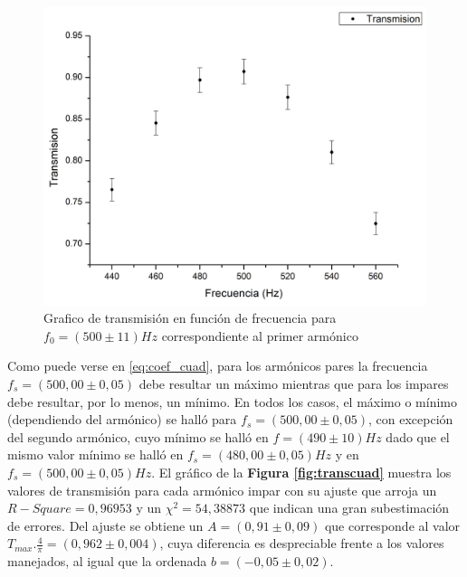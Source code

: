 \documentclass[11pt,a4paper]{article}
\begin{document}
\begin{figure}[h]
\centering
\includegraphics[scale=0.4]{Trans_vs_Frec_Cuad1}
\caption{Grafico de transmisión en función de frecuencia para $f_0 = (500 \pm 11)Hz$ correspondiente al primer armónico}
\label{fig:armonico1cuad}
\end{figure}

Como puede verse en \eqref{eq:coef_cuad}, para los armónicos pares la frecuencia $f_s = (500,00 \pm 0,05)$ debe resultar un máximo mientras que para los impares debe resultar, por lo menos, un mínimo. En todos los casos, el máximo o mínimo (dependiendo del armónico) se halló para $f_s = (500,00 \pm 0,05)$, con excepción del segundo armónico, cuyo mínimo se halló en $f = (490 \pm 10)Hz$ dado que el mismo valor mínimo se halló en $f_s = (480,00 \pm 0,05)Hz$ y en $f_s = (500,00 \pm 0,05)Hz$. El gráfico de la \textbf{Figura \ref{fig:transcuad}} muestra los valores de transmisión para cada armónico impar con su ajuste que arroja un $R-Square = 0,96953$ y un $\chi^2 = 54,38873$ que indican una gran subestimación de errores. Del ajuste se obtiene un $A = (0,91 \pm 0,09)$ que corresponde al valor $T_{max}.\frac{4}{\pi} = (0,962 \pm 0,004)$, cuya diferencia es despreciable frente a los valores manejados, al igual que la ordenada $b =(-0,05 \pm 0,02)$.
\end{document}
